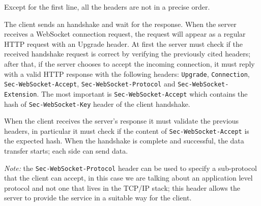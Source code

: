 Except for the first line, all the headers are not in a precise order.\newline

The client sends an handshake and wait for the response.
When the server receives a WebSocket connection request, the request will appear as a regular HTTP request with an Upgrade header.\newline
At first the server must check if the received handshake request is correct by verifying the previously cited headers;
after that, if the server chooses to accept the incoming connection, it must reply with a valid HTTP response with the following headers: \texttt{Upgrade}, \texttt{Connection}, \texttt{Sec-WebSocket-Accept}, \texttt{Sec-WebSocket-Protocol} and  \texttt{Sec-WebSocket-Extension}.\newline
The most important is \texttt{Sec-WebSocket-Accept} which contains the hash of \texttt{Sec-WebSocket-Key} header of the client handshake.


When the client receives the server’s response it must validate the previous headers, in particular it must check if the 
content of \texttt{Sec-WebSocket-Accept} is the expected hash.\newline
When the handshake is complete and successful, the data transfer starts; each side can send data.\newline

\emph{Note:} the \texttt{Sec-WebSocket-Protocol} header can be used to specify a sub-protocol that the client can accept, in this case we are talking about an application level protocol and not one that lives in the TCP/IP stack; this header allows the server to provide the service in a suitable way for the client.

